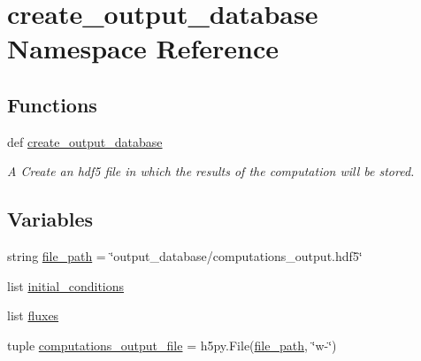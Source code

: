\hypertarget{namespacecreate__output__database}{\section{create\-\_\-output\-\_\-database Namespace Reference}
\label{namespacecreate__output__database}
}
\subsection*{Functions}
\begin{DoxyCompactItemize}
\item 
def \hyperlink{namespacecreate__output__database_a8e6394275b982761a7bbeefb83a85a8c}{create\-\_\-output\-\_\-database}
\begin{DoxyCompactList}\small\item\em A Create an hdf5 file in which the results of the computation will be stored. \end{DoxyCompactList}\end{DoxyCompactItemize}
\subsection*{Variables}
\begin{DoxyCompactItemize}
\item 
string \hyperlink{namespacecreate__output__database_a83d65d86db354703b78c84a953cf8a0d}{file\-\_\-path} = \char`\"{}output\-\_\-database/computations\-\_\-output.\-hdf5\char`\"{}
\item 
list \hyperlink{namespacecreate__output__database_ac37741634f9cfce4d7b2922385b41ce7}{initial\-\_\-conditions}
\item 
list \hyperlink{namespacecreate__output__database_a9b215d5f0ee5ba41c1d1bf0392450d22}{fluxes}
\item 
tuple \hyperlink{namespacecreate__output__database_a508ee6ec63e627741c50fdc1c78fcdb9}{computations\-\_\-output\-\_\-file} = h5py.\-File(\hyperlink{namespacecreate__output__database_a83d65d86db354703b78c84a953cf8a0d}{file\-\_\-path}, \char`\"{}w-\/\char`\"{})
\end{DoxyCompactItemize}


